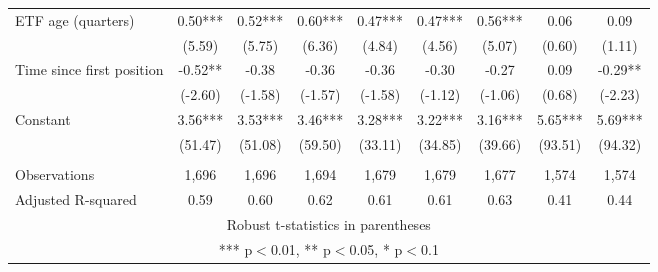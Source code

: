 \documentclass[]{article}
\begin{document}
\begin{tabular}{lcccccccc}
ETF age (quarters) & 0.50*** & 0.52*** & 0.60*** & 0.47*** & 0.47*** & 0.56*** & 0.06 & 0.09 \\
 & (5.59) & (5.75) & (6.36) & (4.84) & (4.56) & (5.07) & (0.60) & (1.11) \\
Time since first position & -0.52** & -0.38 & -0.36 & -0.36 & -0.30 & -0.27 & 0.09 & -0.29** \\
 & (-2.60) & (-1.58) & (-1.57) & (-1.58) & (-1.12) & (-1.06) & (0.68) & (-2.23) \\
Constant & 3.56*** & 3.53*** & 3.46*** & 3.28*** & 3.22*** & 3.16*** & 5.65*** & 5.69*** \\
 & (51.47) & (51.08) & (59.50) & (33.11) & (34.85) & (39.66) & (93.51) & (94.32) \\
 &  &  &  &  &  &  &  &  \\
Observations & 1,696 & 1,696 & 1,694 & 1,679 & 1,679 & 1,677 & 1,574 & 1,574 \\
 Adjusted R-squared & 0.59 & 0.60 & 0.62 & 0.61 & 0.61 & 0.63 & 0.41 & 0.44 \\ \hline
\multicolumn{9}{c}{ Robust t-statistics in parentheses} \\
\multicolumn{9}{c}{ *** p$<$0.01, ** p$<$0.05, * p$<$0.1} \\
\end{tabular}
\end{document}
